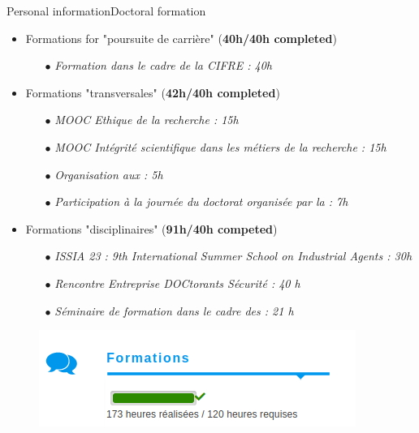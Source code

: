 \begin{frame}{Personal information}{Doctoral formation}

    \begin{itemize}
        \item Formations for "poursuite de carrière" (\textbf{40h/40h completed})
              \begin{itemize}
                  \item[$\bullet$] \textit{Formation dans le cadre de la CIFRE : 40h}
              \end{itemize}
        \item Formations "transversales" (\textbf{42h/40h completed})
              \begin{itemize}
                  \item[$\bullet$] \textit{MOOC Ethique de la recherche : 15h}
                  \item[$\bullet$] \textit{MOOC Intégrité scientifique dans les métiers de la recherche : 15h}
                  \item[$\bullet$] \textit{Organisation aux  : 5h }
                  \item[$\bullet$] \textit{Participation à la journée du doctorat organisée par la  : 7h}
              \end{itemize}
        \item Formations "disciplinaires" (\textbf{91h/40h competed})
              \begin{itemize}
                  \item[$\bullet$] \textit{ISSIA 23 : 9th International Summer School on Industrial Agents : 30h}
                  \item[$\bullet$] \textit{Rencontre Entreprise DOCtorants Sécurité : 40 h}
                  \item[$\bullet$] \textit{Séminaire de formation dans le cadre des  : 21 h}
              \end{itemize}
    \end{itemize}

    \begin{figure}
        \centering
        \includegraphics[width=0.6\linewidth]{figures/adum_formations.png}
    \end{figure}

\end{frame}


